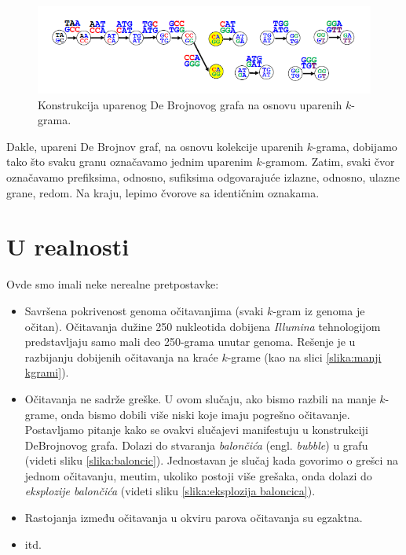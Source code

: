 \begin{figure}[H]
	\centering
	\includegraphics[width=1\textwidth]{poglavlja/3/slike/upareno_lepljenje2.png}
	\caption{Konstrukcija uparenog De Brojnovog grafa na osnovu uparenih $k$-grama.}
	\label{slika:uparenoLepljenje2}
\end{figure} 

Dakle, upareni De Brojnov graf, na osnovu kolekcije uparenih $k$-grama, dobijamo tako što svaku granu označavamo jednim uparenim $k$-gramom. Zatim, svaki čvor označavamo prefiksima, odnosno, sufiksima odgovaraju\'ce izlazne, odnosno, ulazne grane, redom. Na kraju, lepimo čvorove sa identičnim oznakama.

\section{U realnosti}
Ovde smo imali neke nerealne pretpostavke:
\begin{itemize}
	\item Savršena pokrivenost genoma očitavanjima (svaki $k$-gram iz genoma je očitan). Očitavanja dužine 250 nukleotida dobijena \emph{Illumina} tehnologijom predstavljaju samo mali deo 250-grama unutar genoma. Rešenje je u razbijanju dobijenih očitavanja na kraće $k$-grame (kao na slici \ref{slika:manji kgrami}).
	\item Očitavanja ne sadrže greške. U ovom slu\v caju, ako bismo razbili na manje $k$-grame, onda bismo dobili vi\v se niski koje imaju pogre\v sno o\v citavanje. Postavljamo pitanje kako se ovakvi slu\v cajevi manifestuju u konstrukciji DeBrojnovog grafa. Dolazi do stvaranja \emph{balon\v ci\'ca} (engl. \emph{bubble}) u grafu (videti sliku \ref{slika:baloncic}). Jednostavan je slu\v caj kada govorimo o gre\v sci na jednom o\v citavanju, me\dj utim, ukoliko postoji vi\v se gre\v saka, onda dolazi do \emph{eksplozije balon\v ci\'ca} (videti sliku \ref{slika:eksplozija baloncica}).
	\item Rastojanja između očitavanja u okviru parova očitavanja su egzaktna.
	\item itd.
\end{itemize}



